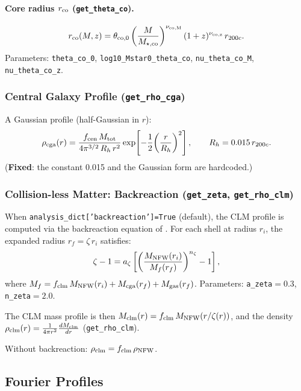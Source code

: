\documentclass[12pt,a4paper]{article}
\newcommand{\code}[1]{\texttt{\small #1}}
\newcommand{\param}[1]{\texttt{\small #1}}
\begin{document}
\paragraph{Core radius $r_{\rm co}$ (\code{get\_theta\_co}).}
\begin{equation}
  r_{\rm co}(M,z) = \theta_{\rm co,0}
  \left(\frac{M}{M_{\star,\rm co}}\right)^{\nu_{\rm co,M}}
  (1+z)^{\nu_{\rm co,z}}\,r_{200c}.
\end{equation}
Parameters: \param{theta\_co\_0}, \param{log10\_Mstar0\_theta\_co},
\param{nu\_theta\_co\_M}, \param{nu\_theta\_co\_z}.

\subsubsection{Central Galaxy Profile (\code{get\_rho\_cga})}
A Gaussian profile (half-Gaussian in $r$):
\begin{equation}
  \rho_{\rm cga}(r) = \frac{f_{\rm cen}\,M_{\rm tot}}{4\pi^{3/2}\,R_h\,r^2}
  \exp\!\left[-\frac{1}{2}\!\left(\frac{r}{R_h}\right)^2\right],
  \qquad R_h = 0.015\,r_{200c}.
\end{equation}
(\textbf{Fixed}: the constant 0.015 and the Gaussian form are hardcoded.)

\subsubsection{Collision-less Matter: Backreaction (\code{get\_zeta}, \code{get\_rho\_clm})}

When \param{analysis\_dict['backreaction']=True} (default), the CLM profile
is computed via the backreaction equation of \cite{Schneider2019}. For each
shell at radius $r_i$, the expanded radius $r_f = \zeta\,r_i$ satisfies:
\begin{equation}
  \zeta - 1 = a_\zeta\left[\left(\frac{M_{\rm NFW}(r_i)}{M_f(r_f)}\right)^{n_\zeta} - 1\right],
\end{equation}
where $M_f = f_{\rm clm}\,M_{\rm NFW}(r_i) + M_{\rm cga}(r_f) + M_{\rm gas}(r_f)$.
Parameters: \param{a\_zeta}$=0.3$, \param{n\_zeta}$=2.0$.

The CLM mass profile is then
$M_{\rm clm}(r) = f_{\rm clm}\,M_{\rm NFW}(r/\zeta(r))$,
and the density $\rho_{\rm clm}(r) = \frac{1}{4\pi r^2}\frac{dM_{\rm clm}}{dr}$
(\code{get\_rho\_clm}).

Without backreaction: $\rho_{\rm clm} = f_{\rm clm}\,\rho_{\rm NFW}$.

\subsection{Fourier Profiles}
\label{sec:fourier}
\end{document}
